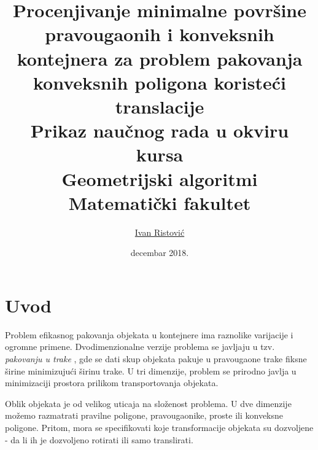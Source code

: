 \documentclass[a4paper]{article}
\theoremstyle{plain}
\theoremstyle{definition}
\begin{document}
\title{Procenjivanje minimalne povr\v{s}ine pravougaonih i konveksnih kontejnera za problem pakovanja konveksnih poligona koriste\'c{}i translacije\\  \small{Prikaz nau\v{c}nog rada u okviru kursa\\Geometrijski algoritmi\\ Matematički fakultet}}

\author{\href{mailto:mi14042@matf.bg.ac.rs}{Ivan Ristovi\'c}}
\date{decembar 2018.}

\maketitle


\tableofcontents

\newpage

\section{Uvod}
\label{sec:Uvod}

Problem efikasnog pakovanja objekata u kontejnere ima raznolike varijacije i ogromne primene. Dvodimenzionalne verzije problema se javljaju u tzv. \emph{pakovanju u trake} \cite{FiveThreeApprox}, gde se dati skup objekata pakuje u pravougaone trake fiksne \v{s}irine minimizuju\'c{}i \v{s}irinu trake. U tri dimenzije, problem se prirodno javlja u minimizaciji prostora prilikom transportovanja objekata.

Oblik objekata je od velikog uticaja na slo\v{z}enost problema. U dve dimenzije mo\v{z}emo razmatrati pravilne poligone, pravougaonike, proste ili konveksne poligone. Pritom, mora se specifikovati koje transformacije objekata su dozvoljene - da li ih je dozvoljeno rotirati ili samo translirati. 
\end{document}
